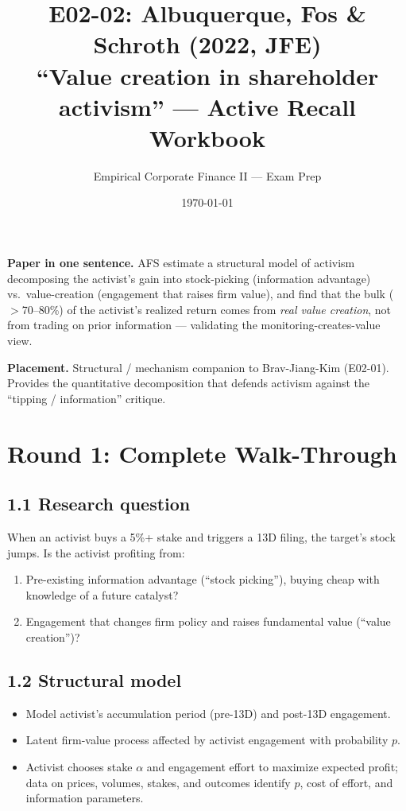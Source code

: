 \documentclass[11pt]{article}
\title{E02-02: Albuquerque, Fos \& Schroth (2022, JFE) \\
\large ``Value creation in shareholder activism'' --- Active Recall Workbook}
\author{Empirical Corporate Finance II --- Exam Prep}
\date{\today}
\begin{document}
\maketitle

\begin{keybox}
\textbf{Paper in one sentence.} AFS estimate a structural model of activism decomposing the activist's gain into stock-picking (information advantage) vs.\ value-creation (engagement that raises firm value), and find that the bulk ($>$70--80\%) of the activist's realized return comes from \emph{real value creation}, not from trading on prior information --- validating the monitoring-creates-value view.

\textbf{Placement.} Structural / mechanism companion to Brav-Jiang-Kim (E02-01). Provides the quantitative decomposition that defends activism against the ``tipping / information'' critique.
\end{keybox}

\section*{Round 1: Complete Walk-Through}

\subsection*{1.1 Research question}
When an activist buys a 5\%+ stake and triggers a 13D filing, the target's stock jumps. Is the activist profiting from:
\begin{enumerate}[label=(\roman*)]
\item Pre-existing information advantage (``stock picking''), buying cheap with knowledge of a future catalyst?
\item Engagement that changes firm policy and raises fundamental value (``value creation'')?
\end{enumerate}

\subsection*{1.2 Structural model}
\begin{itemize}
\item Model activist's accumulation period (pre-13D) and post-13D engagement.
\item Latent firm-value process affected by activist engagement with probability $p$.
\item Activist chooses stake $\alpha$ and engagement effort to maximize expected profit; data on prices, volumes, stakes, and outcomes identify $p$, cost of effort, and information parameters.
\end{itemize}
\end{document}
